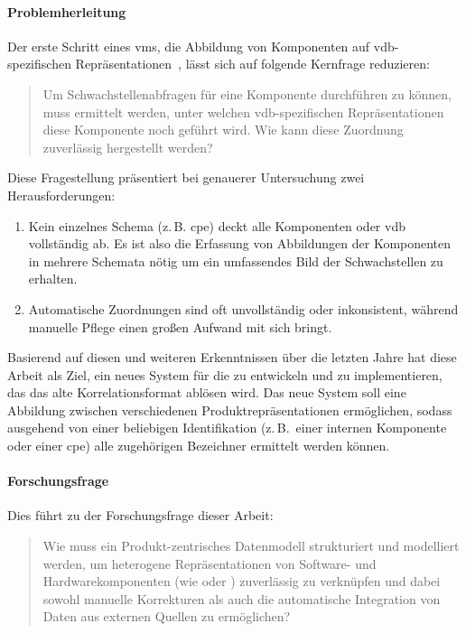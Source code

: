 \paragraph{Problemherleitung}

Der erste Schritt eines \acrshort{vms}, die Abbildung von Komponenten auf \acrshort{vdb}-spezifischen Repräsentationen\ \autocite{Idrissi_Sebai_Faroukhi_Mahouachi_2024}, lässt sich auf folgende Kernfrage reduzieren:

\begin{quote}
    Um Schwachstellenabfragen für eine Komponente durchführen zu können, muss ermittelt werden, unter welchen \acrshort{vdb}-spezifischen Repräsentationen diese Komponente noch geführt wird.
    Wie kann diese Zuordnung zuverlässig hergestellt werden?
\end{quote}

Diese Fragestellung präsentiert bei genauerer Untersuchung zwei Herausforderungen:

\begin{enumerate}
    \item Kein einzelnes Schema (z.\,B. \acrshort{cpe}) deckt alle Komponenten oder \acrshort{vdb} vollständig ab.
    Es ist also die Erfassung von Abbildungen der Komponenten in mehrere Schemata nötig um ein umfassendes Bild der Schwachstellen zu erhalten.
    \item Automatische Zuordnungen sind oft unvollständig oder inkonsistent, während manuelle Pflege einen großen Aufwand mit sich bringt.
\end{enumerate}

Basierend auf diesen und weiteren Erkenntnissen über die letzten Jahre hat diese Arbeit als Ziel, ein neues System für die \metaeffektsp zu entwickeln und zu implementieren, das das alte Korrelationsformat ablösen wird.
Das neue System soll eine Abbildung zwischen verschiedenen Produktrepräsentationen ermöglichen, sodass ausgehend von einer beliebigen Identifikation (z.\,B.\ einer internen Komponente oder einer \acrshort{cpe}) alle zugehörigen Bezeichner ermittelt werden können.

\paragraph{Forschungsfrage}

Dies führt zu der Forschungsfrage dieser Arbeit:

\begin{quote}
    Wie muss ein Produkt-zentrisches Datenmodell strukturiert und modelliert werden, um heterogene Repräsentationen von Software- und Hardwarekomponenten (wie  oder ) zuverlässig zu verknüpfen und
    dabei sowohl manuelle Korrekturen als auch die automatische Integration von Daten aus externen Quellen zu ermöglichen?
\end{quote}


